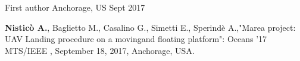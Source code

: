

\begin{cventries}

  \cventry
    {First author} %
    {} %
    {Anchorage, US} %
    {Sept 2017} %
    {
      \begin{cvitems} %
        \item {\textbf{Nisticò A.}, Baglietto M., Casalino G., Simetti E., Sperindè A.,"Marea project: UAV Landing procedure on a movingand floating platform": Oceans ’17 MTS/IEEE , September 18, 2017, Anchorage, USA.}
      \end{cvitems}
    }

\end{cventries}
